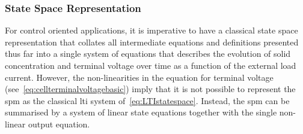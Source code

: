 \subsubsection*{State Space Representation}\label{subsec:basicspmstatespace}

For control  oriented applications, it is  imperative to have a  classical state
space representation  that collates  all intermediate equations  and definitions
presented  thus  far into  a  single  system  of  equations that  describes  the
evolution of solid concentration and terminal voltage over time as a function of
the  external load  current. However,  the non-linearities  in the  equation for
terminal  voltage  (see~\cref{eq:cellterminalvoltagebasic})  imply  that  it  is
not  possible to  represent  the  \gls{spm} as  the  classical \gls{lti}  system
of~\cref{eq:LTIstatespace}. Instead, the \gls{spm} can be summarised by a system
of linear state equations together with the single non-linear output equation.

